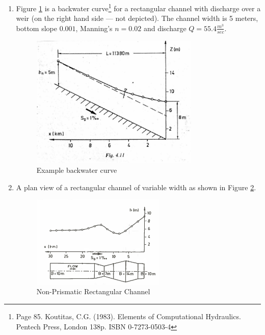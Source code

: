 \documentclass[12pt]{article}
\begin{document}
\begin{enumerate}

\item Figure \ref{fig:example1} is a backwater curve\footnote{Page 85. Koutitas, C.G. (1983). Elements of Computational Hydraulics. Pentech Press, London 138p. ISBN 0-7273-0503-4 } for a rectangular channel with discharge over a weir (on the right hand side --- not depicted).  The channel width is 5 meters, bottom slope $0.001$, Manning's $n=0.02$ and discharge $Q=55.4 \frac{m^3}{sec}$.  

\begin{figure}[h!] %
   \centering
   \includegraphics[height=2.5in]{bw_curve1.jpg} 
   \caption{Example backwater curve} 
   \label{fig:example1}
\end{figure}
\clearpage

\item A plan view of a rectangular channel of variable width as shown in Figure \ref{fig:NonPrismaticExample}.\\

\begin{figure}[h!] %
   \centering
   \includegraphics[width=2.5in]{NonPrismaticExample} 
   \caption{Non-Prismatic Rectangular Channel}
   \label{fig:NonPrismaticExample}
\end{figure}


\end{enumerate}
\end{document}
